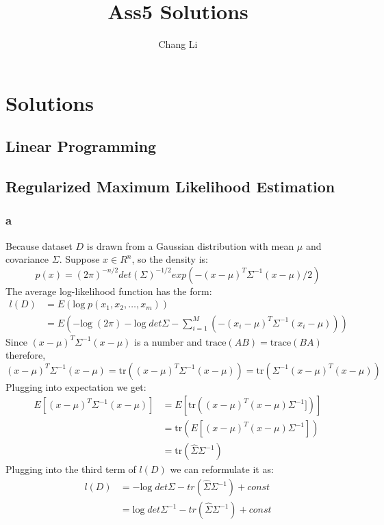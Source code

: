 \message{ !name(ass5_ChangLi.tex)}\documentclass[10pt,a4paper]{article}
\begin{document}

\title{Ass5 Solutions}
\author{Chang Li}
\maketitle

\section{Solutions}

\subsection{Linear Programming}



\subsection{Regularized Maximum Likelihood Estimation}

\subsubsection{a}
Because dataset $D$ is drawn from a Gaussian distribution
with mean $\mu$ and covariance $\Sigma$. Suppose $x\in R^n$,
so the density is:
$$p(x) = (2\pi)^{-n/2}det(\Sigma)^{-1/2}exp(-(x-\mu)^T\Sigma^{-1}(x-\mu)/2)$$
The average log-likelihood function has the form:
\begin{align*}
  l(D) & = E(\text{log}\;p(x_1,x_2,\dots,x_m))\\
       & = E(-\text{log}\;(2\pi) - \text{log}\;det\Sigma
  - \sum_{i=1}^{M}(-(x_i-\mu)^T\Sigma^{-1}(x_i-\mu)))
\end{align*}
Since $(x-\mu)^T\Sigma^{-1}(x-\mu)$ is a number and
$\mathrm{trace}(AB)=\mathrm{trace}(BA)$ therefore,
$$(x-\mu)^T\Sigma^{-1}(x-\mu)= \mathrm{tr}((x-\mu)^T\Sigma^{-1}(x-\mu))=\mathrm{tr}(\Sigma^{-1}(x-\mu)^T(x-\mu))$$ 
Plugging into expectation we get:
\begin{align*}
E[(x-\mu)^T\Sigma^{-1}(x-\mu)] &= E[\mathrm{tr}((x-\mu)^T(x-\mu)\Sigma^{-1}] )] \\
&= \mathrm{tr}(E[(x-\mu)^T(x-\mu)\Sigma^{-1}])\\
&= \mathrm{tr}(\hat{\Sigma}\Sigma^{-1})
\end{align*}
Plugging into the third term of $l(D)$ we can reformulate it as:
\begin{align*}
     l(D) &=- \text{log}\;det\Sigma - tr(\hat{\Sigma}\Sigma^{-1} )+ const \\
       & = \text{log}\;det\Sigma^{-1} - tr(\hat{\Sigma}\Sigma^{-1} ) + const 
\end{align*}
\end{document}
